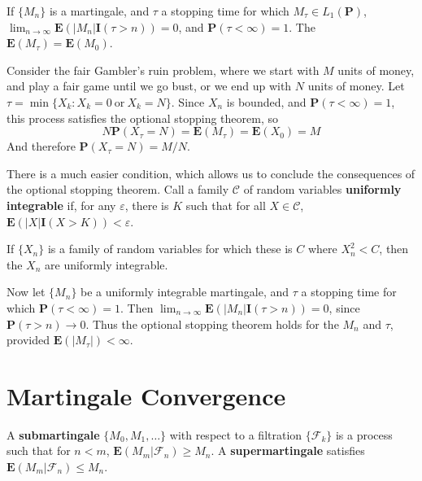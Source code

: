 \begin{theorem}
    If $\{ M_n \}$ is a martingale, and $\tau$ a stopping time for which $M_\tau \in L_1(\mathbf{P})$, $\lim_{n \to \infty} \mathbf{E}(|M_n| \mathbf{I}(\tau > n)) = 0$, and $\mathbf{P}(\tau < \infty) = 1$. The $\mathbf{E}(M_\tau) = \mathbf{E}(M_0)$.
\end{theorem}

\begin{example}
    Consider the fair Gambler's ruin problem, where we start with $M$ units of money, and play a fair game until we go bust, or we end up with $N$ units of money. Let $\tau = \min \{ X_k : X_k = 0\ \text{or}\ X_k = N \}$. Since $X_n$ is bounded, and $\mathbf{P}(\tau < \infty) = 1$, this process satisfies the optional stopping theorem, so
    \[ N \mathbf{P}(X_\tau = N) = \mathbf{E}(M_\tau) = \mathbf{E}(X_0) = M \]
    And therefore $\mathbf{P}(X_\tau = N) = M/N$.
\end{example}

There is a much easier condition, which allows us to conclude the consequences of the optional stopping theorem. Call a family $\mathcal{C}$ of random variables {\bf uniformly integrable} if, for any $\varepsilon$, there is $K$ such that for all $X \in \mathcal{C}$, $\mathbf{E}(|X| \mathbf{I}(X > K)) < \varepsilon$.

\begin{lemma}
    If $\{ X_n \}$ is a family of random variables for which these is $C$ where $X_n^2 < C$, then the $X_n$ are uniformly integrable.
\end{lemma}

Now let $\{ M_n \}$ be a uniformly integrable martingale, and $\tau$ a stopping time for which $\mathbf{P}(\tau < \infty) = 1$. Then $\lim_{n \to \infty} \mathbf{E}(|M_n| \mathbf{I}(\tau > n)) = 0$, since $\mathbf{P}(\tau > n) \to 0$. Thus the optional stopping theorem holds for the $M_n$ and $\tau$, provided $\mathbf{E}(|M_\tau|) < \infty$.

\section{Martingale Convergence}

\begin{definition}
    A {\bf submartingale} $\{ M_0, M_1, \dots \}$ with respect to a filtration $\{ \mathcal{F}_k \}$ is a process such that for $n < m$, $\mathbf{E}(M_m | \mathcal{F}_n) \geq M_n$. A {\bf supermartingale} satisfies $\mathbf{E}(M_m | \mathcal{F}_n) \leq M_n$.
\end{definition}

